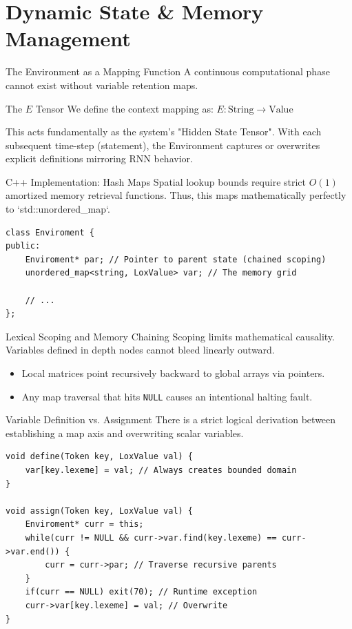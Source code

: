 \documentclass[aspectratio=169]{beamer}
\begin{document}

\section{Dynamic State \& Memory Management}

\begin{frame}{The Environment as a Mapping Function}
    A continuous computational phase cannot exist without variable retention maps.
    \begin{block}{The $E$ Tensor}
        We define the context mapping as: $E: \text{String} \rightarrow \text{Value}$
    \end{block}
    This acts fundamentally as the system's "Hidden State Tensor". With each subsequent time-step (statement), the Environment captures or overwrites explicit definitions mirroring RNN behavior.
\end{frame}

\begin{frame}[fragile]{C++ Implementation: Hash Maps}
    Spatial lookup bounds require strict $O(1)$ amortized memory retrieval functions. Thus, this maps mathematically perfectly to `std::unordered\_map`.
    \begin{lstlisting}
class Enviroment {
public:
    Enviroment* par; // Pointer to parent state (chained scoping)
    unordered_map<string, LoxValue> var; // The memory grid
    
    // ...
};
    \end{lstlisting}
\end{frame}

\begin{frame}{Lexical Scoping and Memory Chaining}
    Scoping limits mathematical causality. Variables defined in depth nodes cannot bleed linearly outward.
    \begin{itemize}
        \item Local matrices point recursively backward to global arrays via pointers.
        \item Any map traversal that hits \texttt{NULL} causes an intentional halting fault.
    \end{itemize}
\end{frame}

\begin{frame}[fragile]{Variable Definition vs. Assignment}
    There is a strict logical derivation between establishing a map axis and overwriting scalar variables.
    \begin{lstlisting}
void define(Token key, LoxValue val) {
    var[key.lexeme] = val; // Always creates bounded domain 
}

void assign(Token key, LoxValue val) {
    Enviroment* curr = this;
    while(curr != NULL && curr->var.find(key.lexeme) == curr->var.end()) {
        curr = curr->par; // Traverse recursive parents
    }
    if(curr == NULL) exit(70); // Runtime exception
    curr->var[key.lexeme] = val; // Overwrite
}
    \end{lstlisting}
\end{frame}
\end{document}
